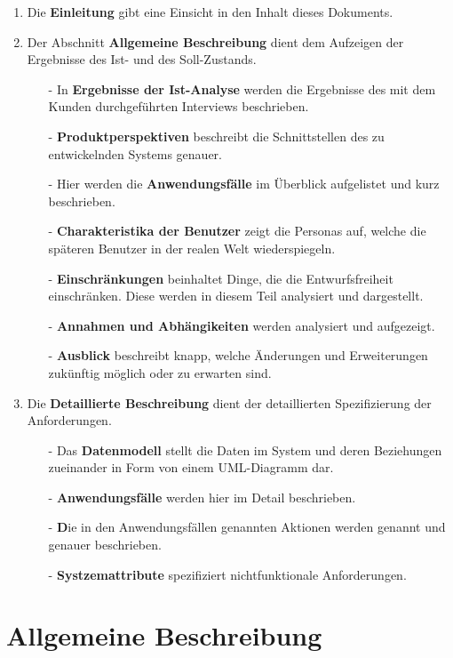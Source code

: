 \documentclass[fontsize=12pt,paper=a4,twoside]{scrartcl}
\begin{document}
\begin{enumerate}
\item Die \textbf{Einleitung} gibt eine Einsicht in den Inhalt dieses Dokuments.
\item Der Abschnitt \textbf{Allgemeine Beschreibung} dient dem Aufzeigen der Ergebnisse des Ist- und des Soll-Zustands.
\begin{itemize}
\item[-]In \textbf{Ergebnisse der Ist-Analyse} werden die Ergebnisse des mit dem Kunden durchgeführten Interviews beschrieben.
\item[-] \textbf{Produktperspektiven} beschreibt die Schnittstellen des zu entwickelnden Systems genauer.
\item[-] Hier werden die \textbf{Anwendungsfälle} im Überblick aufgelistet und kurz beschrieben.
\item[-] \textbf{Charakteristika der Benutzer} zeigt die Personas auf, welche die späteren Benutzer in der realen Welt wiederspiegeln.
\item[-] \textbf{Einschränkungen} beinhaltet Dinge, die die Entwurfsfreiheit einschränken. Diese werden in diesem Teil analysiert und dargestellt.
\item[-] \textbf{Annahmen und Abhängikeiten} werden analysiert und aufgezeigt.
\item[-] \textbf{Ausblick} beschreibt knapp, welche Änderungen und Erweiterungen zukünftig möglich oder zu erwarten sind.
\end{itemize}
\item Die \textbf{Detaillierte Beschreibung} dient der detaillierten Spezifizierung der Anforderungen.
\begin{itemize}
\item[-] Das \textbf{Datenmodell} stellt die Daten im System und deren Beziehungen zueinander in Form von einem UML-Diagramm dar.
\item[-] \textbf{Anwendungsfälle} werden hier im Detail beschrieben.
\item[-] \textbf Die in den Anwendungsfällen genannten {Aktionen} werden genannt und genauer beschrieben.
\item[-] \textbf{Systzemattribute} spezifiziert nichtfunktionale Anforderungen.
\end{itemize}
\end{enumerate}



\section{Allgemeine Beschreibung}
\label{ch:AllgemeineBeschreibung}
\end{document}
